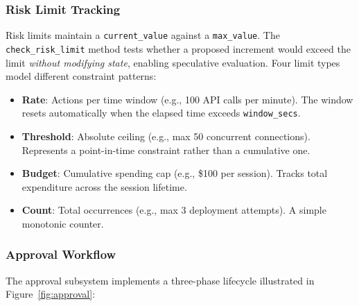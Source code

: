 \documentclass[10pt, twocolumn]{article}
\begin{document}
\subsubsection{Risk Limit Tracking}

Risk limits maintain a \texttt{current\_value} against a \texttt{max\_value}. The \texttt{check\_risk\_limit} method tests whether a proposed increment would exceed the limit \emph{without modifying state}, enabling speculative evaluation. Four limit types model different constraint patterns:

\begin{itemize}[nosep, leftmargin=*]
  \item \textbf{Rate}: Actions per time window (e.g., 100 API calls per minute). The window resets automatically when the elapsed time exceeds \texttt{window\_secs}.
  \item \textbf{Threshold}: Absolute ceiling (e.g., max 50 concurrent connections). Represents a point-in-time constraint rather than a cumulative one.
  \item \textbf{Budget}: Cumulative spending cap (e.g., \$100 per session). Tracks total expenditure across the session lifetime.
  \item \textbf{Count}: Total occurrences (e.g., max 3 deployment attempts). A simple monotonic counter.
\end{itemize}

\subsubsection{Approval Workflow}

The approval subsystem implements a three-phase lifecycle illustrated in Figure~\ref{fig:approval}:
\end{document}
